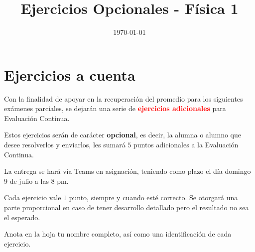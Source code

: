 \documentclass[14pt]{extarticle}
\title{\vspace*{-2cm} Ejercicios Opcionales - Física 1\vspace{-5ex}}
\date{\today}
\newcommand{\textocolor}[2]{\textbf{\textcolor{#1}{#2}}}
\begin{document}
\maketitle

\section{Ejercicios a cuenta}

Con la finalidad de apoyar en la recuperación del promedio para los siguientes exámenes parciales, se dejarán una serie de \textocolor{red}{ejercicios adicionales} para Evaluación Continua.


Estos ejercicios serán de carácter \textocolor{cobalt}{opcional}, es decir, la alumna o alumno que desee resolverlos y enviarlos, les sumará $5$ puntos adicionales a la Evaluación Continua.

La entrega se hará vía Teams en asignación, teniendo como plazo el día domingo 9 de julio a las 8 pm.

Cada ejercicio vale $1$ punto, siempre y cuando esté correcto. Se otorgará una parte proporcional en caso de tener desarrollo detallado pero el resultado no sea el esperado.

Anota en la hoja tu nombre completo, así como una identificación de cada ejercicio.
\end{document}
